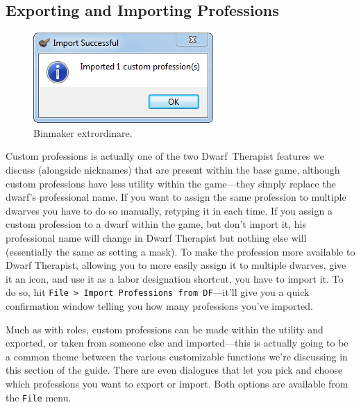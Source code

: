 \documentclass[]{article}
\begin{document}
\subsection{Exporting and Importing Professions}
\label{sec:Exporting and Importing Professions}
\begin{figure}
\vspace{-20pt}
  \begin{center}
    \includegraphics{Sec3Fig12}
  \end{center}
\vspace{-15pt}
\caption{Binmaker extrordinare.}
\end{figure}
Custom professions is actually one of the two \hbox{Dwarf Therapist} features we discuss (alongside
nicknames) that are present within the base game, although custom professions have less utility within
the game---they simply replace the dwarf's professional name. If you want to assign the same profession
to multiple dwarves you have to do so manually, retyping it in each time. If you assign a custom
profession to a dwarf within the game, but don't import it, his professional name will change in Dwarf
Therapist but nothing else will (essentially the same as setting a mask). To make the profession more
available to Dwarf Therapist, allowing you to more easily assign it to multiple dwarves, give it an icon,
and use it as a labor designation shortcut, you have to import it. To do so, hit \texttt{File > Import
Professions from DF}---it'll give you a quick confirmation window telling you how many professions you've
imported.

Much as with roles, custom professions can be made within the utility and exported, or taken from someone
else and imported---this is actually going to be a common theme between the various customizable
functions we're discussing in this section of the guide. There are even dialogues that let you pick and
choose which professions you want to export or import. Both options are available from the \texttt{File}
menu.
\end{document}

